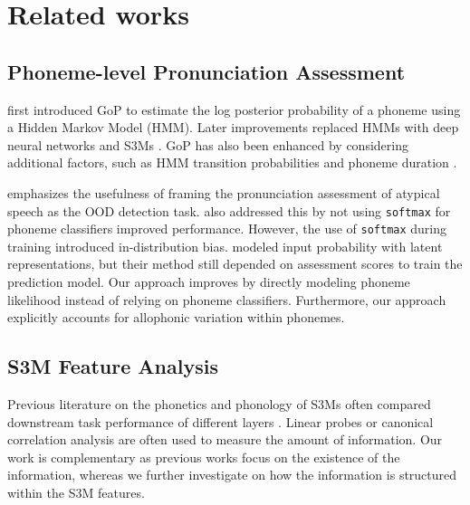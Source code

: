 \section{Related works}
\subsection{Phoneme-level Pronunciation Assessment}
\citet{Witt2000PhonelevelPS} first introduced GoP to estimate the log posterior probability of a phoneme using a Hidden Markov Model (HMM). 
Later improvements replaced HMMs with deep neural networks \citep{hu2015improved-slate, hu2015improved, li2016mispronunciation} and S3Ms \citep{xu21k_interspeech, yeo23_interspeech, cao2024framework}. 
GoP has also been enhanced by considering additional factors, such as HMM transition probabilities \citep{sudhakara2019improved, Shi2020ContextawareGO} and phoneme duration \citep{Shi2020ContextawareGO}.


 emphasizes the usefulness of framing the pronunciation assessment of atypical speech as the OOD detection task.
\citet{yeo23_interspeech} also addressed this by not using \texttt{softmax} for phoneme classifiers improved performance. 
However, the use of \texttt{softmax} during training introduced in-distribution bias. 
\citet{cheng20_interspeech} modeled input probability with latent representations, but their method still depended on assessment scores to train the prediction model. 
Our approach improves by directly modeling phoneme likelihood instead of relying on phoneme classifiers. 
Furthermore, our approach explicitly accounts for allophonic variation within phonemes.



\subsection{S3M Feature Analysis}
Previous literature on the phonetics and phonology of S3Ms often compared downstream task performance of different layers \citep{martin23_interspeech,pasad2021layer,pasad2023comparative,pasad2023self,choi2024understanding}.
Linear probes \citep{martin23_interspeech,choi2024understanding} or canonical correlation analysis \citep{pasad2021layer,pasad2023comparative,pasad2023self} are often used to measure the amount of information.
Our work is complementary as previous works focus on the existence of the information, whereas we further investigate on how the information is structured within the S3M features.


